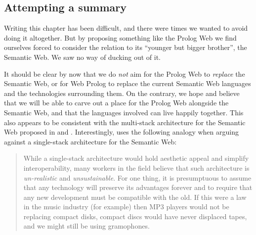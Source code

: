\documentclass{tlp}
\begin{document}
\subsection{Attempting a summary}\label{sec:semantic-web-summary}

\noindent Writing this chapter has been difficult, and there were times we wanted to avoid doing it altogether. But by proposing something like the Prolog Web we find ourselves forced to consider the relation to its ``younger but bigger brother'', the Semantic Web. We saw no way of ducking out of it. 

It should be clear by now that we do \textit{not} aim for the Prolog Web to \textit{replace} the Semantic Web, or for Web Prolog to replace the current Semantic Web languages and the technologies surrounding them. On the contrary, we hope and believe that we will be able to carve out a place for the Prolog Web alongside the Semantic Web, and that the languages involved can live happily together. This also appears to be consistent with the multi-stack architecture for the Semantic Web proposed in \cite{Horrocks2005} and \cite{Kifer2005}. Interestingly, \cite{Kifer2005} uses the following analogy when arguing against a single-stack architecture for the Semantic Web:

\begin{quote}
While a single-stack architecture would hold aesthetic appeal and simplify interoperability, many workers in the field believe that such architecture is \textit{un-realistic} and \textit{unsustainable}. For one thing, it is presumptuous to assume that any technology will preserve its advantages forever and to require that any new development must be compatible with the old. If this were a law in the music industry (for example) then MP3 players would not be replacing compact disks, compact discs would have never displaced tapes, and we might still be using gramophones.
\end{quote}
\end{document}
